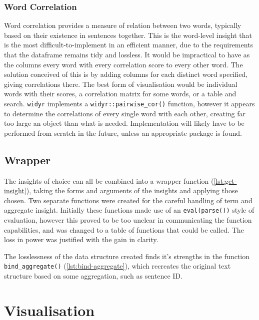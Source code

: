 \documentclass[11pt, a4paper, twoside, titlepage]{report}
\begin{document}
\subsubsection{Word Correlation}\label{sec:word-correlation}

Word correlation provides a measure of relation between two words,
typically based on their existence in sentences together. This is the
word-level insight that is the most difficult-to-implement in an
efficient manner, due to the requirements that the dataframe remains
tidy and lossless. It would be impractical to have as the columns
every word with every correlation score to every other word. The
solution conceived of this is by adding columns for each distinct word
specified, giving correlations there. The best form of visualisation
would be individual words with their scores, a correlation matrix for
some words, or a table and search. \texttt{widyr} implements a
\texttt{widyr::pairwise_cor()} function, however it appears to
determine the correlations of every single word with each other,
creating far too large an object than what is
needed\autocite{robinson19:widyr}. Implementation will likely have to
be performed from scratch in the future, unless an appropriate package
is found.

\subsection{Wrapper}\label{sec:wrapper}

The insights of choice can all be combined into a wrapper function
(\cref{lst:get-insight}), taking the forms and arguments of the
insights and applying those chosen. Two separate functions were
created for the careful handling of term and aggregate insight.
Initially these functions made use of an \texttt{eval(parse())}
style of evaluation, however this proved to be too unclear in
communicating the function capabilities, and was changed to a table of
functions that could be called. The loss in power was justified with
the gain in clarity.

The losslessness of the data structure created finds it's strengths in
the function \texttt{bind_aggregate()}
(\cref{lst:bind-aggregate}), which recreates the original
text structure based on some aggregation, such as sentence ID.\

\section{Visualisation}\label{sec:visualisation}
\end{document}
